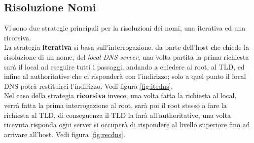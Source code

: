 \documentclass[12pt]{article}
\begin{document}
\subsection{Risoluzione Nomi}\label{subsec:dnsresolution} %
Vi sono due strategie principali per la risoluzioni dei nomi, una iterativa ed una ricorsiva.\\
La strategia \textbf{iterativa} si basa sull'interrogazione, da parte dell'host che chiede la risoluzione di un nome, del \textit{local DNS server}, una volta partita la prima richiesta sarà il local ad eseguire tutti i passaggi, andando a chiedere al root, al TLD, ed infine al authoritative che ci risponderà con l'indirizzo; solo a quel punto il local DNS potrà restituirci l'indirizzo. Vedi figura \ref{fig:itedns}.\\
Nel caso della strategia \textbf{ricorsiva} invece, una volta fatta la richiesta al local, verrà fatta la prima interrogazione al root, sarà poi il root stesso a fare la richiesta al TLD, di conseguenza il TLD la farà all'authoritative, una volta ricevuta risponda ogni server si occuperà di rispondere al livello superiore fino ad arrivare all'host. Vedi figura \ref{fig:recdns}.
\end{document}
